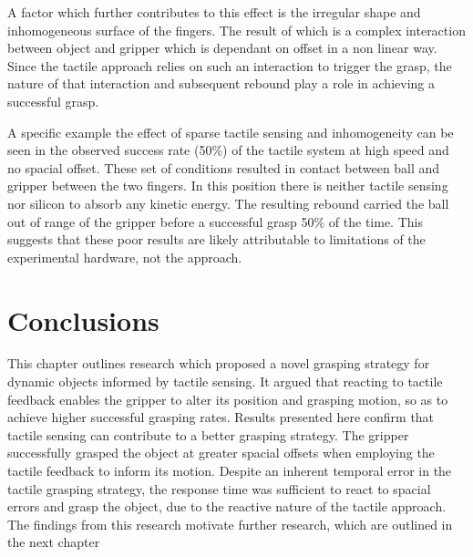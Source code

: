 A factor which further contributes to this effect is the irregular shape and inhomogeneous surface of the fingers. The result of which is a complex interaction between object and gripper which is dependant on offset in a non linear way. Since the tactile approach relies on such an interaction to trigger the grasp, the nature of that interaction and subsequent rebound play a role in achieving a successful grasp. 

A specific example the effect of sparse tactile sensing and inhomogeneity can be seen in the observed success rate (50\%) of the tactile system at high speed and no spacial offset. These set of conditions resulted in contact between ball and gripper between the two fingers. In this position there is neither tactile sensing nor silicon to absorb any kinetic energy. The resulting rebound carried the ball out of range of the gripper before a successful grasp 50\% of the time. This suggests that these poor results are likely attributable to limitations of the experimental hardware, not the approach.

\section{Conclusions}
This chapter outlines research which proposed a novel grasping strategy for dynamic objects informed by tactile sensing. It argued that reacting to tactile feedback enables the gripper to alter its position and grasping motion, so as to achieve higher successful grasping rates. Results presented here confirm that tactile sensing can contribute to a better grasping strategy. The gripper successfully grasped the object at greater spacial offsets when employing the tactile feedback to inform its motion. Despite an inherent temporal error in the tactile grasping strategy, the response time was sufficient to react to spacial errors and grasp the object,
due to the reactive nature of the tactile approach. The findings from this research motivate further research, which are outlined in the next chapter
